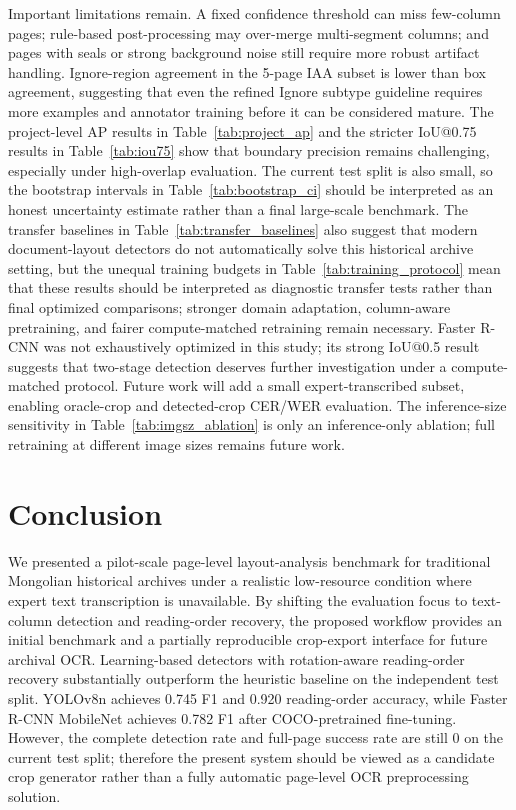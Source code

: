 \documentclass[12pt]{article}
\begin{document}
Important limitations remain. A fixed confidence threshold can miss few-column pages; rule-based post-processing may over-merge multi-segment columns; and pages with seals or strong background noise still require more robust artifact handling. Ignore-region agreement in the 5-page IAA subset is lower than box agreement, suggesting that even the refined Ignore subtype guideline requires more examples and annotator training before it can be considered mature. The project-level AP results in Table~\ref{tab:project_ap} and the stricter IoU@0.75 results in Table~\ref{tab:iou75} show that boundary precision remains challenging, especially under high-overlap evaluation. The current test split is also small, so the bootstrap intervals in Table~\ref{tab:bootstrap_ci} should be interpreted as an honest uncertainty estimate rather than a final large-scale benchmark. The transfer baselines in Table~\ref{tab:transfer_baselines} also suggest that modern document-layout detectors do not automatically solve this historical archive setting, but the unequal training budgets in Table~\ref{tab:training_protocol} mean that these results should be interpreted as diagnostic transfer tests rather than final optimized comparisons; stronger domain adaptation, column-aware pretraining, and fairer compute-matched retraining remain necessary. Faster R-CNN was not exhaustively optimized in this study; its strong IoU@0.5 result suggests that two-stage detection deserves further investigation under a compute-matched protocol. Future work will add a small expert-transcribed subset, enabling oracle-crop and detected-crop CER/WER evaluation. The inference-size sensitivity in Table~\ref{tab:imgsz_ablation} is only an inference-only ablation; full retraining at different image sizes remains future work.

\section{Conclusion}
We presented a pilot-scale page-level layout-analysis benchmark for traditional Mongolian historical archives under a realistic low-resource condition where expert text transcription is unavailable. By shifting the evaluation focus to text-column detection and reading-order recovery, the proposed workflow provides an initial benchmark and a partially reproducible crop-export interface for future archival OCR. Learning-based detectors with rotation-aware reading-order recovery substantially outperform the heuristic baseline on the independent test split. YOLOv8n achieves 0.745 F1 and 0.920 reading-order accuracy, while Faster R-CNN MobileNet achieves 0.782 F1 after COCO-pretrained fine-tuning. However, the complete detection rate and full-page success rate are still 0 on the current test split; therefore the present system should be viewed as a candidate crop generator rather than a fully automatic page-level OCR preprocessing solution.
\end{document}
